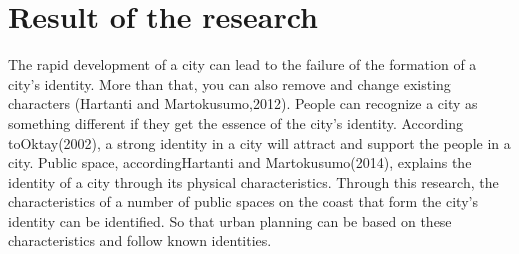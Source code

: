 \documentclass[11pt]{simart} %
\begin{document}
\section{Result of the research}
The rapid development of a city can lead to the failure of the formation of a city's identity. More than that, you can also remove and change existing characters (Hartanti and Martokusumo,2012). People can recognize a city as something different if they get the essence of the city's identity. According toOktay(2002), a strong identity in a city will attract and support the people in a city. Public space, accordingHartanti and Martokusumo(2014), explains the identity of a city through its physical characteristics. Through this research, the characteristics of a number of public spaces on the coast that form the city's identity can be identified. So that urban planning can be based on these characteristics and follow known identities.

\begin{comment}
\section{Subject of study}
In the past few years, I have been studying about public space topic especially in the waterfront. It has resulted one of thesis entitled Visitor Preference on Senggol Waterfront of Parepare and a publication related to public realms. The reason I studied it was that there are an increasing of demand and inftrastructure development across the public space waterfront in my city.
\end{comment}

%



\end{document}
